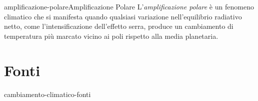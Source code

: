 \documentclass[preview]{standalone}
\begin{document}
\begin{snippetdefinition}{amplificazione-polare}{Amplificazione Polare}
    L'\textit{amplificazione polare} è un fenomeno climatico che si manifesta quando
    qualsiasi variazione nell'equilibrio radiativo netto,
    come l'intensificazione dell'effetto serra,
    produce un cambiamento di temperatura più marcato vicino ai poli rispetto alla media planetaria.
\end{snippetdefinition}


\section{Fonti}

\nocite{*} %

\begin{snippet}{cambiamento-climatico-fonti}
    \printbibliography[heading=none]
\end{snippet}
\end{document}
